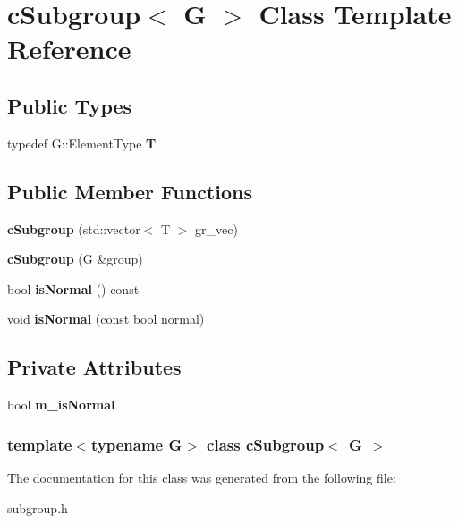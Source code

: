 \hypertarget{classcSubgroup}{
\section{c\-Subgroup$<$ \-G $>$ \-Class \-Template \-Reference}
\label{classcSubgroup}
}
\subsection*{\-Public \-Types}
\begin{DoxyCompactItemize}
\item 
\hypertarget{classcSubgroup_ab88b056e488e5b0b6c7849e9a4357371}{
typedef \-G\-::\-Element\-Type {\bfseries \-T}}
\label{classcSubgroup_ab88b056e488e5b0b6c7849e9a4357371}

\end{DoxyCompactItemize}
\subsection*{\-Public \-Member \-Functions}
\begin{DoxyCompactItemize}
\item 
\hypertarget{classcSubgroup_aa47db239ee5fc0c2904fc5870e102daa}{
{\bfseries c\-Subgroup} (std\-::vector$<$ \-T $>$ gr\-\_\-vec)}
\label{classcSubgroup_aa47db239ee5fc0c2904fc5870e102daa}

\item 
\hypertarget{classcSubgroup_ad10d7eaf034a3f96bfdb84e824f7ba30}{
{\bfseries c\-Subgroup} (\-G \&group)}
\label{classcSubgroup_ad10d7eaf034a3f96bfdb84e824f7ba30}

\item 
\hypertarget{classcSubgroup_a5c239313a0f1ae9ae64f87da3c552bee}{
bool {\bfseries is\-Normal} () const }
\label{classcSubgroup_a5c239313a0f1ae9ae64f87da3c552bee}

\item 
\hypertarget{classcSubgroup_a39fa2b6d316997d9ecbb2fc51cf86bc6}{
void {\bfseries is\-Normal} (const bool normal)}
\label{classcSubgroup_a39fa2b6d316997d9ecbb2fc51cf86bc6}

\end{DoxyCompactItemize}
\subsection*{\-Private \-Attributes}
\begin{DoxyCompactItemize}
\item 
\hypertarget{classcSubgroup_a21daac84974df25a48465da9438cb552}{
bool {\bfseries m\-\_\-is\-Normal}}
\label{classcSubgroup_a21daac84974df25a48465da9438cb552}

\end{DoxyCompactItemize}
\subsubsection*{template$<$typename \-G$>$ class c\-Subgroup$<$ G $>$}



\-The documentation for this class was generated from the following file\-:\begin{DoxyCompactItemize}
\item 
subgroup.\-h\end{DoxyCompactItemize}
